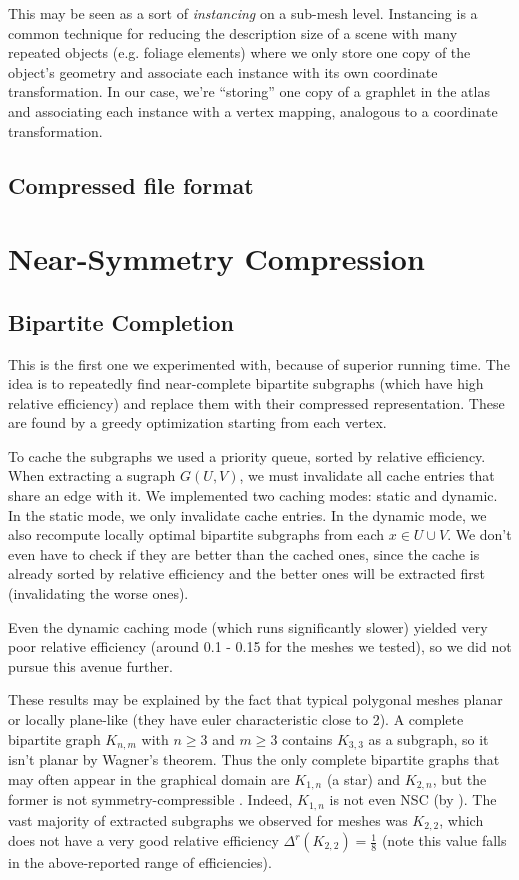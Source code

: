 \documentclass{egpubl}
\begin{document}
This may be seen as a sort of \textit{instancing} on a sub-mesh level. Instancing is a common technique for reducing the description size of a scene with many repeated objects (e.g. foliage elements) where we only store one copy of the object's geometry and associate each instance with its own coordinate transformation. In our case, we're ``storing'' one copy of a graphlet in the atlas and associating each instance with a vertex mapping, analogous to a coordinate transformation.

\subsection{Compressed file format}


\section{Near-Symmetry Compression}

\subsection{Bipartite Completion}

This is the first one we experimented with, because of superior running time.
The idea is to repeatedly find near-complete bipartite subgraphs (which have high relative efficiency) and replace them with their compressed representation. These are found by a greedy optimization starting from each vertex.

To cache the subgraphs we used a priority queue, sorted by relative efficiency. When extracting a sugraph $G(U,V)$, we must invalidate all cache entries that share an edge with it. 
We implemented two caching modes: static and dynamic. In the static mode, we only invalidate cache entries. In the dynamic mode, we also recompute locally optimal bipartite subgraphs from each $x \in U \cup V$. We don't even have to check if they are better than the cached ones, since the cache is already sorted by relative efficiency and the better ones will be extracted first (invalidating the worse ones).

Even the dynamic caching mode (which runs significantly slower) yielded very poor relative efficiency (around 0.1 - 0.15 for the meshes we tested), so we did not pursue this avenue further.

These results may be explained by the fact that typical polygonal meshes planar or locally plane-like (they have euler characteristic close to 2). A complete bipartite graph $K_{n,m}$ with $n \geq 3$ and $m \geq 3$ contains $K_{3,3}$ as a subgraph, so it isn't planar by Wagner's theorem. Thus the only complete bipartite graphs that may often appear in the graphical domain are $K_{1,n}$ (a star) and $K_{2,n}$, but the former%
is not symmetry-compressible \cite[Theorem 2]{cibej2021automorphisms}. Indeed, $K_{1,n}$ is not even NSC (by \cite[Theorem 6]{cibej2021automorphisms}).
The vast majority of extracted subgraphs we observed for meshes was $K_{2,2}$, which does not have a very good relative efficiency $\Delta^r(K_{2,2}) = \frac{1}{8}$ (note this value falls in the above-reported range of efficiencies).
\end{document}
